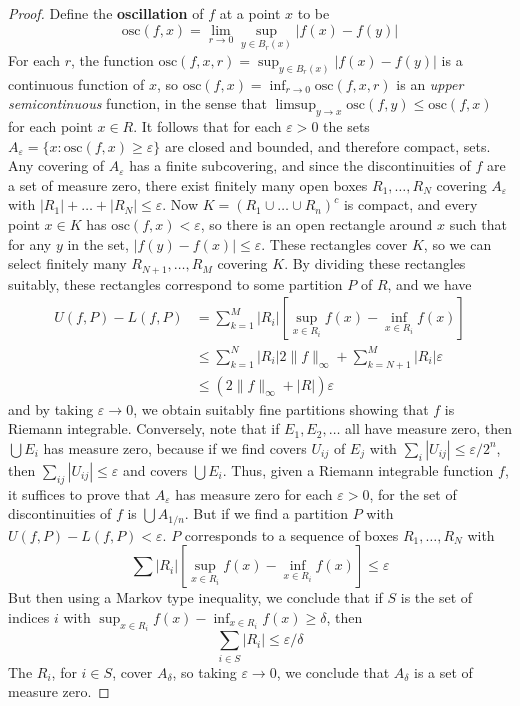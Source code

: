 \begin{proof}
  Define the {\bf oscillation} of $f$ at a point $x$ to be
  \[ \text{osc}(f,x) = \lim_{r \to 0} \sup_{y \in B_r(x)} |f(x) - f(y)| \]
  For each $r$, the function $\text{osc}(f,x,r) = \sup_{y \in B_r(x)} |f(x) - f(y)|$ is a continuous function of $x$, so $\text{osc}(f,x) = \inf_{r \to 0} \text{osc}(f,x,r)$ is an {\it upper semicontinuous} function, in the sense that $\limsup_{y \to x} \text{osc}(f,y) \leq \text{osc}(f,x)$ for each point $x \in R$. It follows that for each $\varepsilon > 0$ the sets $A_\varepsilon = \{ x: \text{osc}(f,x) \geq \varepsilon \}$ are closed and bounded, and therefore compact, sets. Any covering of $A_\varepsilon$ has a finite subcovering, and since the discontinuities of $f$ are a set of measure zero, there exist finitely many open boxes $R_1, \dots, R_N$ covering $A_\varepsilon$ with $|R_1| + \dots + |R_N| \leq \varepsilon$. Now $K = (R_1 \cup \dots \cup R_n)^c$ is compact, and every point $x \in K$ has $\text{osc}(f,x) < \varepsilon$, so there is an open rectangle around $x$ such that for any $y$ in the set, $|f(y) - f(x)| \leq \varepsilon$. These rectangles cover $K$, so we can select finitely many $R_{N+1}, \dots, R_M$ covering $K$. By dividing these rectangles suitably, these rectangles correspond to some partition $P$ of $R$, and we have
  \begin{align*}
    U(f,P) - L(f,P) &= \sum_{k = 1}^M |R_i| \left[ \sup_{x \in R_i} f(x) - \inf_{x \in R_i} f(x) \right]\\
    &\leq \sum_{k = 1}^N |R_i| 2 \| f \|_\infty + \sum_{k = N+1}^M |R_i| \varepsilon\\
    &\leq (2 \| f \|_\infty + |R|) \varepsilon
  \end{align*}
  and by taking $\varepsilon \to 0$, we obtain suitably fine partitions showing that $f$ is Riemann integrable. Conversely, note that if $E_1, E_2, \dots$ all have measure zero, then $\bigcup E_i$ has measure zero, because if we find covers $U_{ij}$ of $E_j$ with $\sum_i |U_{ij}| \leq \varepsilon/2^n$, then $\sum_{ij} |U_{ij}| \leq \varepsilon$ and covers $\bigcup E_i$. Thus, given a Riemann integrable function $f$, it suffices to prove that $A_\varepsilon$ has measure zero for each $\varepsilon > 0$, for the set of discontinuities of $f$ is $\bigcup A_{1/n}$. But if we find a partition $P$ with $U(f,P) - L(f,P) < \varepsilon$. $P$ corresponds to a sequence of boxes $R_1, \dots, R_N$ with
  \[ \sum |R_i| \left[ \sup_{x \in R_i} f(x) - \inf_{x \in R_i} f(x) \right] \leq \varepsilon \]
  But then using a Markov type inequality, we conclude that if $S$ is the set of indices $i$ with $\sup_{x \in R_i} f(x) - \inf_{x \in R_i} f(x) \geq \delta$, then
  \[ \sum_{i \in S} |R_i| \leq \varepsilon / \delta \]
  The $R_i$, for $i \in S$, cover $A_\delta$, so taking $\varepsilon \to 0$, we conclude that $A_\delta$ is a set of measure zero.
\end{proof}

